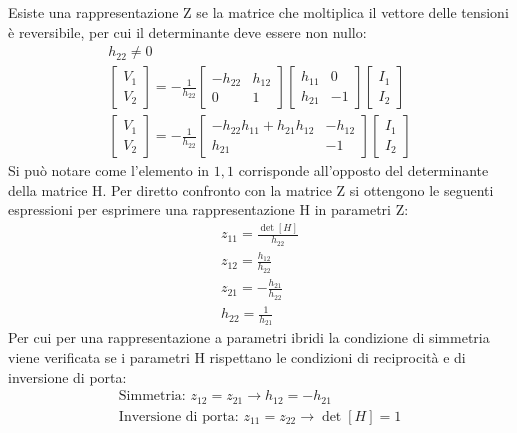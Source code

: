 \documentclass{article}
\numberwithin{equation}{subsection}
\begin{document}
Esiste una rappresentazione Z se la matrice che moltiplica il vettore delle tensioni è reversibile, per cui il determinante deve essere non nullo:
\begin{gather*}
    h_{22}\neq0\\
    \begin{bmatrix}
        V_1\\V_2
    \end{bmatrix}=\displaystyle-\frac{1}{h_{22}}\begin{bmatrix}
        -h_{22}&h_{12}\\0&1
    \end{bmatrix}\begin{bmatrix}
        h_{11}&0\\h_{21}&-1
    \end{bmatrix}\begin{bmatrix}
        I_1\\I_2
    \end{bmatrix}\\
    \begin{bmatrix}
        V_1\\V_2
    \end{bmatrix}=\displaystyle-\frac{1}{h_{22}}\begin{bmatrix}
        -h_{22}h_{11}+h_{21}h_{12}&-h_{12}\\h_{21}&-1
    \end{bmatrix}\begin{bmatrix}
        I_1\\I_2
    \end{bmatrix}
\end{gather*}
Si può notare come l'elemento in $1,1$ corrisponde all'opposto del determinante della matrice H. Per diretto confronto con la matrice Z si ottengono le seguenti espressioni 
per esprimere una rappresentazione H in parametri Z:
\begin{gather*}
    z_{11}=\displaystyle\frac{\det[H]}{h_{22}}\\
    z_{12}=\displaystyle\frac{h_{12}}{h_{22}}\\
    z_{21}=\displaystyle-\frac{h_{21}}{h_{22}}\\
    h_{22}=\displaystyle\frac{1}{h_{21}}
\end{gather*}
Per cui per una rappresentazione a parametri ibridi la condizione di simmetria viene verificata se i parametri H rispettano le condizioni di reciprocità e di inversione 
di porta:
\begin{gather}
    \mbox{Simmetria: }z_{12}=z_{21}\to h_{12}=-h_{21}\\
    \mbox{Inversione di porta: }z_{11}=z_{22}\to\det[H]=1
\end{gather}
\end{document}
